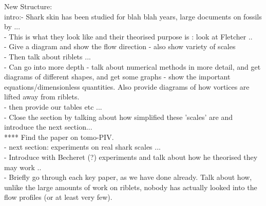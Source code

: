 \documentclass[12pt,oneside,a4paper]{article}
\begin{document}
New Structure:\\
intro:-	Shark skin has been studied for blah blah years, large documents on fossils by ...\\
-	This is what they look like and their theorised purpose is :  look at Fletcher ..\\
-	Give a diagram and show the flow direction - also show variety of scales\\
-	Then talk about riblets ...\\
-	Can go into more depth - talk about numerical methods in more detail, and get diagrams of different shapes, and get some graphs - show the important equations/dimensionless quantities. Also provide diagrams of how vortices are lifted away from riblets.\\
-	then provide our tables etc ...\\
-	Close the section by talking about how simplified these 'scales' are and introduce the next section...\\
****	Find the paper on tomo-PIV.\\
-	next section: experiments on real shark scales ... \\
-	Introduce with Becheret (?) experiments and talk about how he theorised they may work .. \\
-	Briefly go through each key paper, as we have done already. Talk about how, unlike the large amounts of work on riblets, nobody has actually looked into the flow profiles (or at least very few).

\newpage
\end{document}
